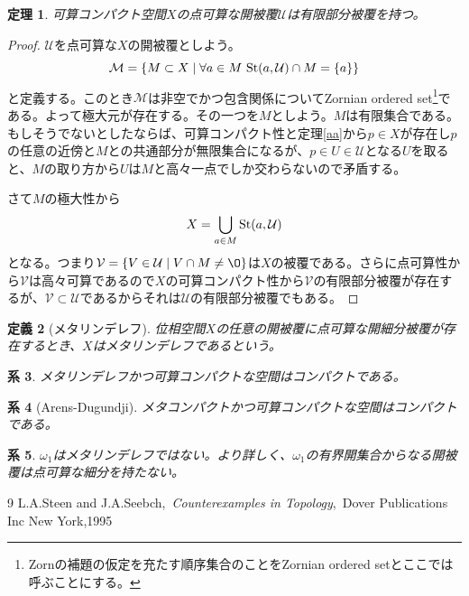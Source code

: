 \documentclass[leqno]{jsarticle}
\newtheorem{thm}{定理}
\newtheorem{cor}[thm]{系}
\newtheorem{df}[thm]{定義}
\newcommand{\s}{\text{{\rm St}} }
\begin{document}
\begin{thm}
可算コンパクト空間$X$の点可算な開被覆$\mathcal{U}$は有限部分被覆を持つ。
\end{thm}
\begin{proof}
$\mathcal{U}$を点可算な$X$の開被覆としよう。
\[
\mathcal{M}=\{M\subset X\mid \forall a\in M\ \s(a,\mathcal{U})\cap M=\{a\}\}
\]
と定義する。このとき$\mathcal{M}$は非空でかつ包含関係についてZornian ordered set\footnote{Zornの補題の仮定を充たす順序集合のことをZornian ordered setとここでは呼ぶことにする。}である。よって極大元が存在する。その一つを$M$としよう。$M$は有限集合である。もしそうでないとしたならば、可算コンパクト性と定理\ref{aa}から$p\in X$が存在し$p$の任意の近傍と$M$との共通部分が無限集合になるが、$p\in U\in \mathcal{U}$となる$U$を取ると、$M$の取り方から$U$は$M$と高々一点でしか交わらないので矛盾する。\par
さて$M$の極大性から
\[
X=\bigcup_{a\in M}\s(a,\mathcal{U})
\]
となる。つまり$\mathcal{V}=\{V\in \mathcal{U}\mid V\cap M\neq\O\}$は$X$の被覆である。さらに点可算性から$\mathcal{V}$は高々可算であるので$X$の可算コンパクト性から$\mathcal{V}$の有限部分被覆が存在するが、$\mathcal{V}\subset \mathcal{U}$であるからそれは$\mathcal{U}$の有限部分被覆でもある。
\end{proof}

\begin{df}[メタリンデレフ]
位相空間$X$の任意の開被覆に点可算な開細分被覆が存在するとき、$X$はメタリンデレフであるという。
\end{df}

\begin{cor}
メタリンデレフかつ可算コンパクトな空間はコンパクトである。
\end{cor}


\begin{cor}[Arens-Dugundji]
メタコンパクトかつ可算コンパクトな空間はコンパクトである。
\end{cor}


\begin{cor}
$\omega_1$はメタリンデレフではない。より詳しく、$\omega_1$の有界開集合からなる開被覆は点可算な細分を持たない。
\end{cor}






































	
\begin{thebibliography}{9}
L.A.Steen and J.A.Seebch,\ {\it Counterexamples in Topology},\ Dover Publications Inc New York,1995
\end{thebibliography}




			
\end{document}
